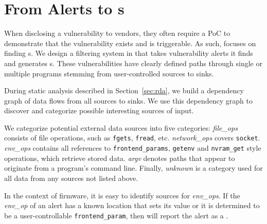 \section{From Alerts to \trupoc{}s}
\label{sec:alert-ranking}

When disclosing a vulnerability to vendors, they often require a PoC to demonstrate that the vulnerability exists and is triggerable.
As such, \mango focuses on finding \trupoc{}s.
We design a filtering system in \mango that takes vulnerability alerts it finds and generates \trupoc{}s.
These vulnerabilities have clearly defined paths through single or multiple programs stemming from user-controlled sources to sinks.

During static analysis described in Section~\ref{sec:rda}, we build a dependency graph of data flows from all sources to sinks.
We use this dependency graph to discover and categorize possible interesting sources of input.

We categorize potential external data sources into five categories:
\textit{file\_ops} consists of file operations, such as \texttt{fgets}, \texttt{fread}, etc.
\textit{network\_ops} covers \texttt{socket}.
\textit{env\_ops} contains all references to \texttt{frontend\_params}, \texttt{getenv} and \texttt{nvram\_get} style operations, which retrieve stored data.
\textit{argv} denotes paths that appear to originate from a program's command line.
Finally, \textit{unknown} is a category used for all data from any sources not listed above.

In the context of firmware, it is easy to identify sources for \textit{env\_ops}.
If the \textit{env\_op} of an alert has a known location that sets its value or it is determined to be a user-controllable \texttt{frontend\_param}, then \mango will report the alert as a \trupoc.

